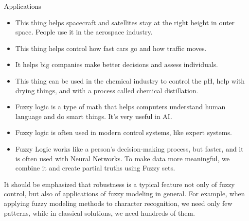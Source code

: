 Applications
\begin{itemize}
    \item This thing helps spacecraft and satellites stay at the right height in outer space. People use it in the aerospace industry.
\item This thing helps control how fast cars go and how traffic moves.
\item It helps big companies make better decisions and assess individuals.
\item This thing can be used in the chemical industry to control the pH, help with drying things, and with a process called chemical distillation.
\item Fuzzy logic is a type of math that helps computers understand human language and do smart things. It's very useful in AI.
\item Fuzzy logic is often used in modern control systems, like expert systems.
\item Fuzzy Logic works like a person's decision-making process, but faster, and it is often used with Neural Networks. To make data more meaningful, we combine it and create partial truths using Fuzzy sets.
\end{itemize}

It should be emphasized that robustness is a typical feature not only of fuzzy
control, but also of applications of fuzzy modeling in general. For example, when
applying fuzzy modeling methods to character recognition, we need only few patterns, while in classical solutions, we need hundreds of them. 














